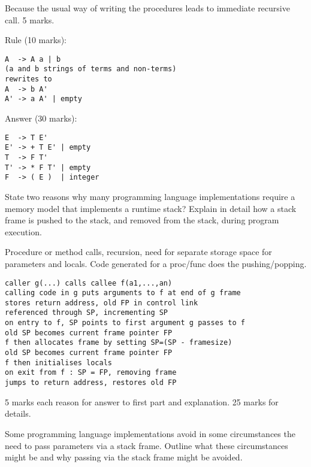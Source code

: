 \documentclass[11pt]{bareexam}
\begin{document}
\begin{questions}
\begin{subquestions}
\begin{modelanswer}
Because the usual way of writing the 
procedures leads to immediate recursive call. 5 marks.

Rule (10 marks):
\begin{verbatim}
A  -> A a | b
(a and b strings of terms and non-terms)
rewrites to 
A  -> b A'
A' -> a A' | empty
\end{verbatim}
Answer (30 marks):
\begin{verbatim}
E  -> T E'
E' -> + T E' | empty
T  -> F T'
T' -> * F T' | empty
F  -> ( E )  | integer
\end{verbatim}
\end{modelanswer}


\end{subquestions}

\newpage

\question

\begin{subquestions}
\subquestion
\begin{subsubquestions}
\subsubquestion
State two reasons why many 
programming language implementations require a memory model that 
implements a runtime stack?
\subsubquestion
Explain in detail how a stack frame is pushed to the stack, and 
removed from the stack, during program execution. 
\end{subsubquestions}

\begin{modelanswer}
Procedure or method calls, recursion, need for separate storage space for
parameters and locals.
Code generated for a proc/func does the pushing/popping.
\begin{verbatim}
caller g(...) calls callee f(a1,...,an)
calling code in g puts arguments to f at end of g frame
stores return address, old FP in control link
referenced through SP, incrementing SP
on entry to f, SP points to first argument g passes to f
old SP becomes current frame pointer FP
f then allocates frame by setting SP=(SP - framesize)
old SP becomes current frame pointer FP
f then initialises locals
on exit from f : SP = FP, removing frame
jumps to return address, restores old FP
\end{verbatim}
5 marks each reason
for answer to first part and explanation. 
25 marks for details.
\end{modelanswer}

\subquestion
\begin{subsubquestions}
\subsubquestion
Some programming language implementations avoid in some circumstances the
need to pass parameters via a stack frame. Outline what these circumstances
might be and why passing via the stack frame might be avoided.


\end{subsubquestions}
\end{subquestions}
\end{questions}
\end{document}
